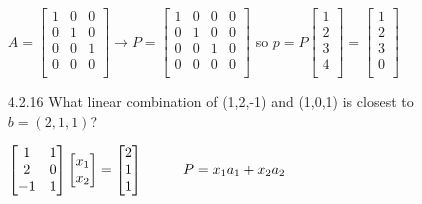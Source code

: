 \documentclass[10pt,twoside,reqno]{article}
\begin{document}
\begin{enumerate}
\begin{center}
$
A=
\begin{bmatrix}
1&0&0\\
0&1&0\\
0&0&1\\
0&0&0\\
\end{bmatrix}
\rightarrow
P=
\begin{bmatrix}
1&0&0&0\\
0&1&0&0\\
0&0&1&0\\
0&0&0&0\\
\end{bmatrix}
$
 so 
$p=P
\begin{bmatrix}
1\\
2\\
3\\
4\\
\end{bmatrix}
=
\begin{bmatrix}
1\\
2\\
3\\
0\\
\end{bmatrix}
$
\end{center}
\vspace{3mm}
\item[4.2.16] What linear combination of (1,2,-1) and (1,0,1) is closest to $b = (2, 1, 1)$? \\
\vspace{3mm}
\begin{center}
$
\begin{bmatrix}
1&1\\
2&0\\
-1&1\\
\end{bmatrix}
\begin{bmatrix}
x_1\\
x_2\\
\end{bmatrix}
=
\begin{bmatrix}
2\\
1\\
1\\
\end{bmatrix}
\hspace{10mm}
P=x_1a_1+x_2a_2
$ \\ \vspace{1mm}

\end{center}
\end{enumerate}
\end{document}
